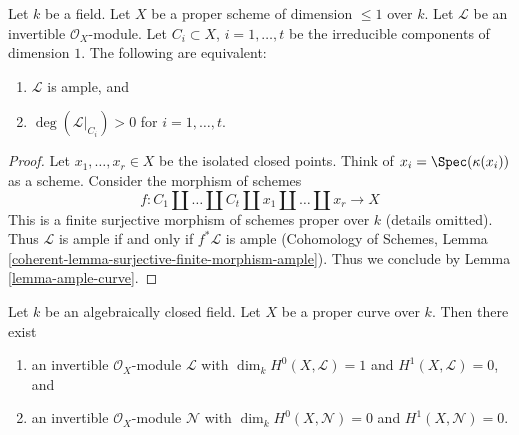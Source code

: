 \begin{lemma}
\label{lemma-ampleness-in-terms-of-degrees-components}
Let $k$ be a field. Let $X$ be a proper scheme of dimension $\leq 1$
over $k$. Let $\mathcal{L}$ be an invertible $\mathcal{O}_X$-module.
Let $C_i \subset X$, $i = 1, \ldots, t$ be the irreducible components
of dimension $1$. The following are equivalent:
\begin{enumerate}
\item $\mathcal{L}$ is ample, and
\item $\deg(\mathcal{L}|_{C_i}) > 0$ for $i = 1, \ldots, t$.
\end{enumerate}
\end{lemma}

\begin{proof}
Let $x_1, \ldots, x_r \in X$ be the isolated closed points.
Think of $x_i = \Spec(\kappa(x_i))$ as a scheme.
Consider the morphism of schemes
$$
f : C_1 \amalg \ldots \amalg C_t \amalg x_1 \amalg \ldots \amalg x_r
\longrightarrow X
$$
This is a finite surjective morphism of schemes proper over $k$
(details omitted). Thus $\mathcal{L}$ is ample if and only if
$f^*\mathcal{L}$ is ample (Cohomology of Schemes, Lemma
\ref{coherent-lemma-surjective-finite-morphism-ample}).
Thus we conclude by Lemma \ref{lemma-ample-curve}.
\end{proof}

\begin{lemma}
\label{lemma-general-degree-g-line-bundle}
Let $k$ be an algebraically closed field. Let $X$ be a proper curve over $k$.
Then there exist
\begin{enumerate}
\item an invertible $\mathcal{O}_X$-module $\mathcal{L}$ with
$\dim_k H^0(X, \mathcal{L}) = 1$ and $H^1(X, \mathcal{L}) = 0$, and
\item an invertible $\mathcal{O}_X$-module $\mathcal{N}$ with
$\dim_k H^0(X, \mathcal{N}) = 0$ and $H^1(X, \mathcal{N}) = 0$.
\end{enumerate}
\end{lemma}

